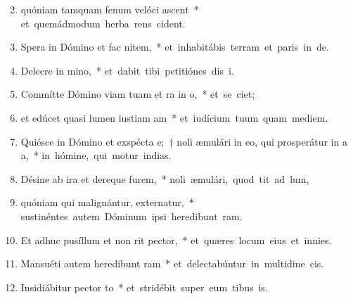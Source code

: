 \begin{flushleft}
\begin{enumerate}[leftmargin=*]
\setcounter{enumi}{1}

\item quóniam tamquam fenum velóci ascent~* \mbox{et quemádmodum herba rens cident.}

\item Spera in Dómino et fac nitem,~* \mbox{et inhabitábis terram et paris in de.}

\item Delecre in mino,~* \mbox{et dabit tibi petitiónes dis i.}

\item Commítte Dómino viam tuam et ra in o,~* \mbox{et se ciet;}

\item et edúcet quasi lumen iustiam am~* \mbox{et iudícium tuum quam mediem.}

\item Quiésce in Dómino et exspécta e;~† noli æmulári in eo, qui prosperátur in a a,~* \mbox{in hómine, qui motur indias.}

\item Désine ab ira et dereque furem,~* \mbox{noli æmulári, quod tit ad lum,}

\item quóniam qui malignántur, externatur,~* \mbox{sustinéntes autem Dóminum ipsi heredibunt ram.}

\item Et adhuc pusíllum et non rit pector,~* \mbox{et quæres locum eius et  innies.}

\item Mansuéti autem heredibunt ram~* \mbox{et delectabúntur in multidine cis.}

\item Insidiábitur pector to~* \mbox{et stridébit super eum tibus is.}


\end{enumerate}
\end{flushleft}
